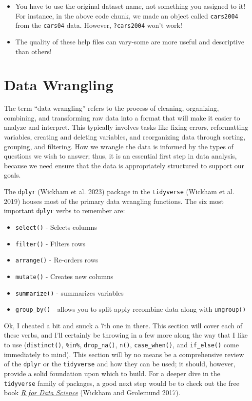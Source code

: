 \documentclass[
  letterpaper,
]{book}
\providecommand{\tightlist}{%
  \setlength{\itemsep}{0pt}\setlength{\parskip}{0pt}}\usepackage{longtable,booktabs,array}
\begin{document}
\begin{itemize}
\tightlist
\item
  You have to use the original dataset name, not something you assigned
  to it! For instance, in the above code chunk, we made an object called
  \texttt{cars2004} from the \texttt{cars04} data. However,
  \texttt{?cars2004} won't work!
\item
  The quality of these help files can vary-some are more useful and
  descriptive than others!
\end{itemize}

\section{Data Wrangling}\label{data-wrangling}

The term ``data wrangling'' refers to the process of cleaning,
organizing, combining, and transforming raw data into a format that will
make it easier to analyze and interpret. This typically involves tasks
like fixing errors, reformatting variables, creating and deleting
variables, and reorganizing data through sorting, grouping, and
filtering. How we wrangle the data is informed by the types of questions
we wish to answer; thus, it is an essential first step in data analysis,
because we need ensure that the data is appropriately structured to
support our goals.

The \texttt{dplyr} (Wickham et al. 2023) package in the
\texttt{tidyverse} (Wickham et al. 2019) houses most of the primary data
wrangling functions. The six most important \texttt{dplyr} verbs to
remember are:

\begin{itemize}
\tightlist
\item
  \texttt{select()} - Selects columns
\item
  \texttt{filter()} - Filters rows
\item
  \texttt{arrange()} - Re-orders rows
\item
  \texttt{mutate()} - Creates new columns
\item
  \texttt{summarize()} - summarizes variables
\item
  \texttt{group\_by()} - allows you to split-apply-recombine data along
  with \texttt{ungroup()}
\end{itemize}

Ok, I cheated a bit and snuck a 7th one in there. This section will
cover each of these verbs, and I'll certainly be throwing in a few more
along the way that I like to use (\texttt{distinct()}, \texttt{\%in\%},
\texttt{drop\_na()}, \texttt{n()}, \texttt{case\_when()}, and
\texttt{if\_else()} come immediately to mind). This section will by no
means be a comprehensive review of the \texttt{dplyr} or the
\texttt{tidyverse} and how they can be used; it should, however, provide
a solid foundation upon which to build. For a deeper dive in the
\texttt{tidyverse} family of packages, a good next step would be to
check out the free book \href{https://r4ds.hadley.nz/}{\emph{R for Data
Science}} (Wickham and Grolemund 2017).
\end{document}
